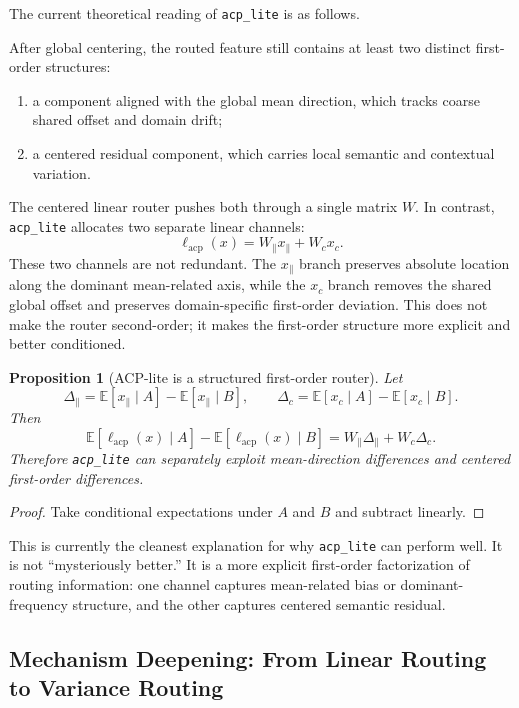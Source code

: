\documentclass[11pt]{article}
\newtheorem{proposition}{Proposition}
\begin{document}
The current theoretical reading of \texttt{acp\_lite} is as follows.

After global centering, the routed feature still contains at least two distinct first-order structures:
\begin{enumerate}
    \item a component aligned with the global mean direction, which tracks coarse shared offset and domain drift;
    \item a centered residual component, which carries local semantic and contextual variation.
\end{enumerate}

The centered linear router pushes both through a single matrix $W$. In contrast, \texttt{acp\_lite} allocates two separate linear channels:
\[
\ell_{\mathrm{acp}}(x)=W_{\parallel}x_{\parallel}+W_c x_c.
\]
These two channels are not redundant. The $x_{\parallel}$ branch preserves absolute location along the dominant mean-related axis, while the $x_c$ branch removes the shared global offset and preserves domain-specific first-order deviation. This does not make the router second-order; it makes the first-order structure more explicit and better conditioned.

\begin{proposition}[ACP-lite is a structured first-order router]
Let
\[
\Delta_{\parallel}
=
\mathbb{E}[x_{\parallel}\mid A]-\mathbb{E}[x_{\parallel}\mid B],
\qquad
\Delta_c
=
\mathbb{E}[x_c\mid A]-\mathbb{E}[x_c\mid B].
\]
Then
\[
\mathbb{E}[\ell_{\mathrm{acp}}(x)\mid A]-\mathbb{E}[\ell_{\mathrm{acp}}(x)\mid B]
=
W_{\parallel}\Delta_{\parallel}+W_c\Delta_c.
\]
Therefore \texttt{acp\_lite} can separately exploit mean-direction differences and centered first-order differences.
\end{proposition}

\begin{proof}
Take conditional expectations under $A$ and $B$ and subtract linearly.
\end{proof}

This is currently the cleanest explanation for why \texttt{acp\_lite} can perform well. It is not ``mysteriously better.'' It is a more explicit first-order factorization of routing information: one channel captures mean-related bias or dominant-frequency structure, and the other captures centered semantic residual.

\subsection{Mechanism Deepening: From Linear Routing to Variance Routing}
\end{document}
